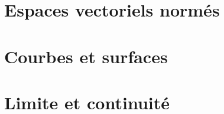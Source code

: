 \section{Espaces vectoriels normés}




\section{Courbes et surfaces}



\section{Limite et continuité}


